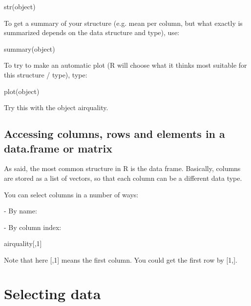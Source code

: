 \documentclass[a4paper,twoside]{tufte-book}\usepackage[]{graphicx}\usepackage[]{color}
\begin{document}
\begin{Anhang}
\begin{Schunk}
\begin{Sinput}
str(object)
\end{Sinput}
\end{Schunk}

To get a summary of your structure (e.g. mean per column, but what exactly is summarized depends on the data structure and type), use:

\begin{Schunk}
\begin{Sinput}
summary(object)
\end{Sinput}
\end{Schunk}

To try to make an automatic plot (R will choose what it thinks most suitable for this structure / type), type:

\begin{Schunk}
\begin{Sinput}
plot(object)
\end{Sinput}
\end{Schunk}

Try this with the object airquality. 

\subsection{Accessing columns, rows and elements in a data.frame or matrix}

As said, the most common structure in R is the data frame. Basically, columns are stored as a list of vectors, so that each column can be a different data type.

You can select columns in a number of ways:

- By name:
\begin{Schunk}
\end{Schunk}

- By column index: 

\begin{Schunk}
\begin{Sinput}
airquality[,1]
\end{Sinput}
\end{Schunk}

Note that here [,1] means the first column. You could get the first row by [1,].

\section{Selecting data}


\end{Anhang}
\end{document}
